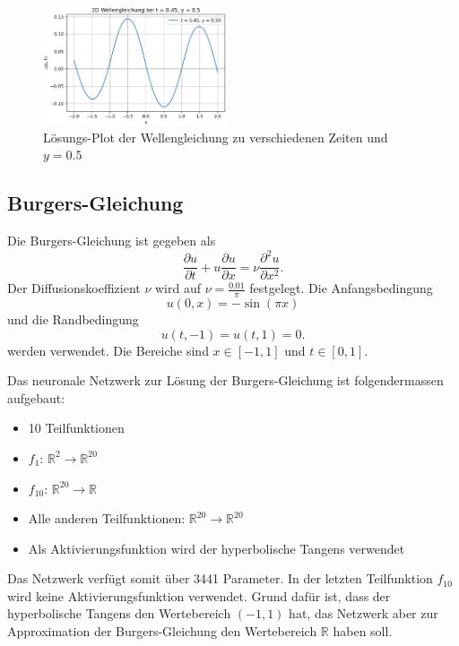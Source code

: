 \begin{figure}
    \includegraphics[width=0.48\textwidth]{papers/neuronal/images/wave_solution_t045.png}
    \caption{Lösungs-Plot der Wellengleichung zu verschiedenen Zeiten und $y = 0.5$}\label{fig:loesung_wellen_fix_yt}
\end{figure}

\subsection{Burgers-Gleichung}\label{neuronal:subsection:burgers_gleichung}
Die Burgers-Gleichung ist gegeben als
\begin{equation}
    \frac{\partial u}{\partial t} + u \frac{\partial u}{\partial x} = \nu \frac{\partial^2 u}{\partial x^2}.
    \label{neuronal:burgers}
\end{equation}
Der Diffusionskoeffizient \( \nu \) wird auf \( \nu = \frac{0.01}{\pi} \) festgelegt.
Die Anfangsbedingung
\begin{equation}
    u(0, x) = - \sin(\pi x)
    \label{neuronal:burgers_anfang}
\end{equation}
und die Randbedingung
\begin{equation}
    u(t, -1) = u(t, 1) = 0.
    \label{neuronal:burgers_rand}
\end{equation}
werden verwendet.
Die Bereiche sind \( x \in [-1,1] \) und \( t \in [0,1] \).

Das neuronale Netzwerk zur Lösung der Burgers-Gleichung ist folgendermassen aufgebaut:
\begin{itemize}
    \item 10 Teilfunktionen
    \item \( f_1 \): \( \mathbb{R}^2 \longrightarrow \mathbb{R}^{20} \) 
    \item \( f_{10} \): \( \mathbb{R}^{20} \longrightarrow \mathbb{R} \)
    \item Alle anderen Teilfunktionen: \( \mathbb{R}^{20} \longrightarrow \mathbb{R}^{20} \)
    \item Als Aktivierungsfunktion wird der hyperbolische Tangens verwendet
\end{itemize}
Das Netzwerk verfügt somit über 3441 Parameter.
In der letzten Teilfunktion \( f_{10} \) wird keine Aktivierungsfunktion verwendet.
Grund dafür ist, dass der hyperbolische Tangens den Wertebereich \((-1, 1)\) hat, das Netzwerk aber zur Approximation der Burgers-Gleichung den Wertebereich \( \mathbb{R} \) haben soll.

